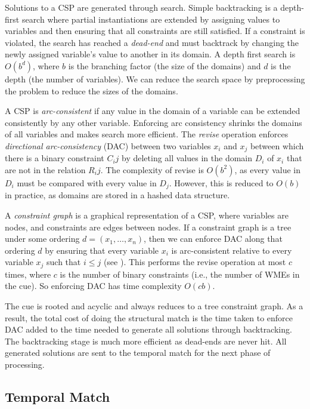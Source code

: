 \documentclass[envcountsame]{llncs}
\begin{document}
  Solutions to a CSP are generated through search.
  Simple backtracking is a depth-first search where partial instantiations are extended by assigning values to variables and then ensuring that all constraints are still satisfied.
  If a constraint is violated, the search has reached a \emph{dead-end} and must backtrack by changing the newly assigned variable's value to another in its domain.
  A depth first search is $O(b^d)$, where $b$ is the branching factor (the size of the domains) and $d$ is the depth (the number of variables).
  We can reduce the search space by preprocessing the problem to reduce the sizes of the domains.

  A CSP is \emph{arc-consistent} if any value in the domain of a variable can be extended consistently by any other variable.
  Enforcing arc consistency shrinks the domains of all variables and makes search more efficient.
  The \emph{revise} operation enforces \emph{directional arc-consistency} (DAC) between two variables $x_i$ and $x_j$ between which there is a binary constraint $C_ij$ by deleting all values in the domain $D_i$ of $x_i$ that are not in the relation $R_ij$.
  The complexity of revise is $O(b^2)$, as every value in $D_i$ must be compared with every value in $D_j$.
  However, this is reduced to $O(b)$ in practice, as domains are stored in a hashed data structure.

  A \emph{constraint graph} is a graphical representation of a CSP, where variables are nodes, and constraints are edges between nodes.
  If a constraint graph is a tree under some ordering $d = (x_1,\dots,x_n)$, then we can enforce DAC along that ordering $d$ by ensuring that every variable $x_i$ is arc-consistent relative to every variable $x_j$ such that $i \leq j$ (see \cite{dechter2003constraint}).
  This performs the revise operation at most $c$ times, where $c$ is the number of binary constraints (i.e., the number of WMEs in the cue).
  So enforcing DAC has time complexity $O(cb)$.

  The cue is rooted and acyclic and always reduces to a tree constraint graph.
  As a result, the total cost of doing the structural match is the time taken to enforce DAC added to the time needed to generate all solutions through backtracking.
  The backtracking stage is much more efficient as dead-ends are never hit.
  All generated solutions are sent to the temporal match for the next phase of processing.

  \subsection{Temporal Match}
  \label{sec:temporal}
\end{document}

